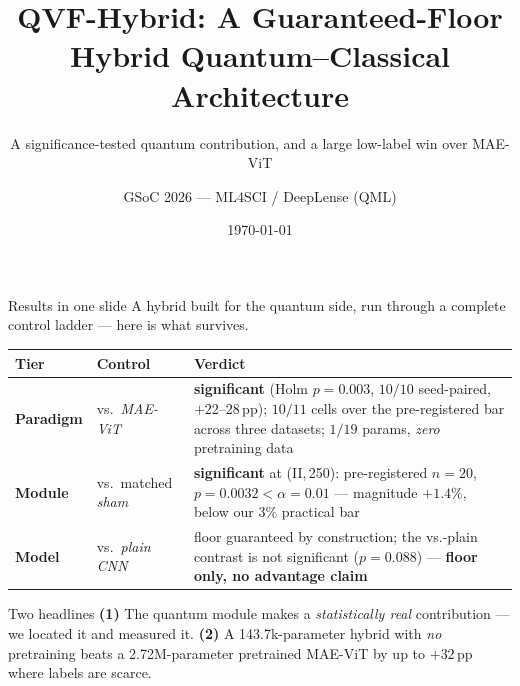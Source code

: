 \documentclass[aspectratio=169,10pt]{beamer}
\title{QVF-Hybrid: A Guaranteed-Floor Hybrid Quantum--Classical Architecture}
\subtitle{A significance-tested quantum contribution, and a large
low-label win over MAE-ViT}
\author{GSoC 2026 --- ML4SCI / DeepLense (QML)}
\date{\today}
\newcommand{\gd}[1]{\textcolor{good}{#1}}
\newcommand{\bd}[1]{\textcolor{bad}{#1}}
\begin{document}
\maketitle

\begin{frame}{Results in one slide}
A hybrid built for the quantum side, run through a complete control ladder ---
here is what survives.
\smallskip

\scriptsize
\begin{tabular}{@{}llp{6.9cm}@{}}
\toprule
Tier & Control & Verdict \\
\midrule
\textbf{Paradigm} & vs.\ \emph{MAE-ViT} &
  \gd{\textbf{significant}} (Holm $p{=}0.003$, $10/10$ seed-paired,
  $+22$--$28$\,pp); $10/11$ cells over the pre-registered bar across three
  datasets; $1/19$ params, \emph{zero} pretraining data \\[2pt]
\textbf{Module} & vs.\ matched \emph{sham} &
  \gd{\textbf{significant}} at (II,\,250): pre-registered $n{=}20$,
  $p{=}0.0032<\alpha{=}0.01$ --- magnitude \textbf{$+1.4\%$}, below our
  $3\%$ practical bar \\[2pt]
\textbf{Model} & vs.\ \emph{plain CNN} &
  \gd{floor guaranteed by construction}; the vs.-plain contrast is
  \bd{not significant} ($p{=}0.088$) --- \textbf{floor only, no advantage claim} \\
\bottomrule
\end{tabular}
\normalsize
\smallskip

\begin{block}{Two headlines}
\textbf{(1)} The quantum module makes a \emph{statistically real} contribution ---
we located it and measured it.
\textbf{(2)} A 143.7k-parameter hybrid with \emph{no} pretraining beats a
2.72M-parameter pretrained MAE-ViT by up to $+32$\,pp where labels are scarce.
\end{block}
\end{frame}
\end{document}
